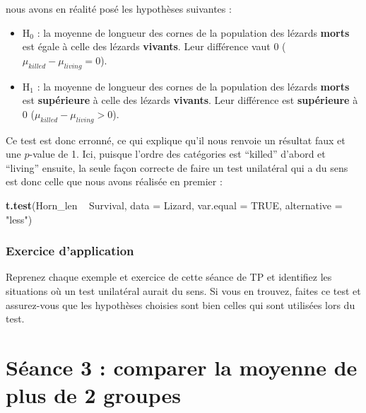 \documentclass[
  a4paper,
]{article}
\newenvironment{Shaded}{\begin{snugshade}}{\end{snugshade}}
\newcommand{\DataTypeTok}[1]{\textcolor[rgb]{0.00,0.34,0.68}{#1}}
\newcommand{\KeywordTok}[1]{\textcolor[rgb]{0.12,0.11,0.11}{\textbf{#1}}}
\newcommand{\NormalTok}[1]{\textcolor[rgb]{0.12,0.11,0.11}{#1}}
\newcommand{\OperatorTok}[1]{\textcolor[rgb]{0.12,0.11,0.11}{#1}}
\newcommand{\OtherTok}[1]{\textcolor[rgb]{0.00,0.43,0.16}{#1}}
\newcommand{\StringTok}[1]{\textcolor[rgb]{0.75,0.01,0.01}{#1}}
\providecommand{\tightlist}{%
  \setlength{\itemsep}{0pt}\setlength{\parskip}{0pt}}
\begin{document}
nous avons en réalité posé les hypothèses suivantes :

\begin{itemize}
\tightlist
\item
  H\(_0\) : la moyenne de longueur des cornes de la population des lézards \textbf{morts} est égale à celle des lézards \textbf{vivants}. Leur différence vaut 0 (\(\mu_{killed}-\mu_{living} = 0\)).
\item
  H\(_1\) : la moyenne de longueur des cornes de la population des lézards \textbf{morts} est \textbf{supérieure} à celle des lézards \textbf{vivants}. Leur différence est \textbf{supérieure} à 0 (\(\mu_{killed}-\mu_{living} > 0\)).
\end{itemize}

Ce test est donc erronné, ce qui explique qu'il nous renvoie un résultat faux et une \(p\)-value de 1. Ici, puisque l'ordre des catégories est ``killed'' d'abord et ``living'' ensuite, la seule façon correcte de faire un test unilatéral qui a du sens est donc celle que nous avons réalisée en premier :

\begin{Shaded}
\begin{Highlighting}[]
\KeywordTok{t.test}\NormalTok{(Horn_len }\OperatorTok{~}\StringTok{ }\NormalTok{Survival, }
       \DataTypeTok{data =}\NormalTok{ Lizard, }\DataTypeTok{var.equal =} \OtherTok{TRUE}\NormalTok{,}
       \DataTypeTok{alternative =} \StringTok{"less"}\NormalTok{)}
\end{Highlighting}
\end{Shaded}

\hypertarget{exercice-dapplication-3}{%
\subsubsection{Exercice d'application}\label{exercice-dapplication-3}}

Reprenez chaque exemple et exercice de cette séance de TP et identifiez les situations où un test unilatéral aurait du sens. Si vous en trouvez, faites ce test et assurez-vous que les hypothèses choisies sont bien celles qui sont utilisées lors du test.

\hypertarget{suxe9ance-3-comparer-la-moyenne-de-plus-de-2-groupes}{%
\section{Séance 3 : comparer la moyenne de plus de 2 groupes}\label{suxe9ance-3-comparer-la-moyenne-de-plus-de-2-groupes}}
\end{document}
